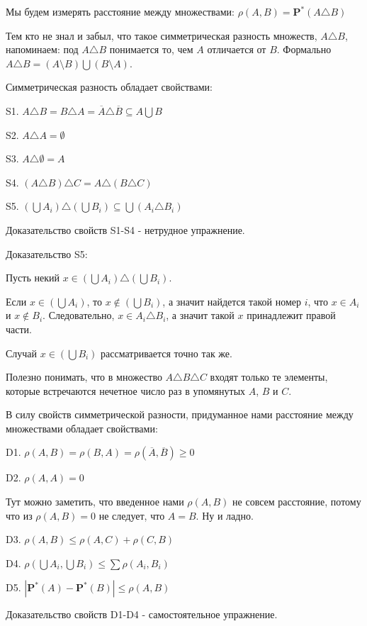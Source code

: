 {Мы будем измерять расстояние между множествами:
$\rho(A,B)=\mathbf{P^{*}}(A\triangle B)$

Тем кто не знал и забыл, что такое симметрическая разность
множеств, $A\triangle B$, напоминаем: под $A\triangle B$
понимается то, чем $A$ отличается от $B$. Формально $A\triangle
B=(A\setminus B)\bigcup(B\setminus A)$.

Симметрическая разность обладает свойствами:

S1. $A\triangle B=B\triangle A=\overline{A}\triangle
\overline{B}\subseteq A\bigcup B$

S2. $A\triangle A=\emptyset$

S3. $A\triangle\emptyset=A$

S4. $(A\triangle B)\triangle C=A\triangle (B\triangle C)$

S5. $(\bigcup A_{i})\triangle (\bigcup B_{i}) \subseteq \bigcup
(A_{i} \triangle B_{i})$

Доказательство свойств S1-S4 - нетрудное упражнение.

Доказательство S5:

Пусть некий $x \in (\bigcup A_{i})\triangle (\bigcup B_{i})$.

Если $x \in (\bigcup A_{i})$, то $x \notin (\bigcup B_{i})$, а
значит найдется такой номер $i$, что $x \in A_{i}$ и $x \notin
B_{i}$. Следовательно, $x \in A_{i} \triangle B_{i}$, а значит
такой $x$ принадлежит правой части.

Случай $x \in (\bigcup B_{i})$ рассматривается точно так же.


Полезно понимать, что в множество $A\triangle B\triangle C$ входят
только те элементы, которые встречаются нечетное число раз в
упомянутых $A$, $B$ и $C$.


В силу свойств симметрической разности, придуманное нами
расстояние между множествами обладает свойствами:

D1. $\rho(A,B)=\rho(B,A)=\rho(\overline{A},\overline{B})\geq 0$

D2. $\rho(A,A)=0$

Тут можно заметить, что введенное нами $\rho(A,B)$ не совсем
расстояние, потому что из $\rho(A,B)=0$ не следует, что $A=B$. Ну
и ладно.

D3. $\rho(A,B)\leq \rho(A,C)+\rho(C,B)$

D4. $\rho(\bigcup A_{i},\bigcup B_{i})\leq \sum\rho(A_{i},B_{i})$

D5. $|\mathbf{P^{*}}(A)-\mathbf{P^{*}}(B)|\leq\rho(A,B)$

Доказательство свойств D1-D4 - самостоятельное упражнение.

}
